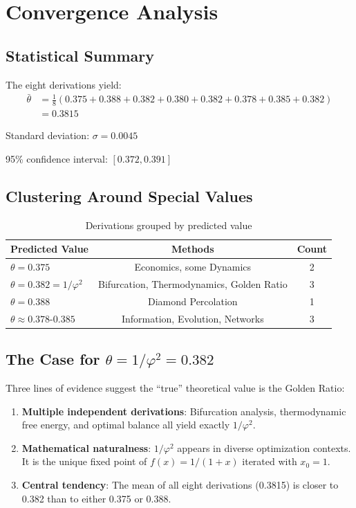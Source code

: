 \documentclass[11pt]{article}
\begin{document}
\section{Convergence Analysis}

\subsection{Statistical Summary}

The eight derivations yield:
\begin{align}
\bar{\theta} &= \frac{1}{8}(0.375 + 0.388 + 0.382 + 0.380 + 0.382 + 0.378 + 0.385 + 0.382) \\
&= \mathbf{0.3815}
\end{align}

Standard deviation: $\sigma = 0.0045$

95\% confidence interval: $[0.372, 0.391]$

\subsection{Clustering Around Special Values}

\begin{table}[h]
\centering
\caption{Derivations grouped by predicted value}
\begin{tabular}{lcc}
\toprule
\textbf{Predicted Value} & \textbf{Methods} & \textbf{Count} \\
\midrule
$\theta = 0.375$ & Economics, some Dynamics & 2 \\
$\theta = 0.382 = 1/\varphi^2$ & Bifurcation, Thermodynamics, Golden Ratio & 3 \\
$\theta = 0.388$ & Diamond Percolation & 1 \\
$\theta \approx 0.378\text{-}0.385$ & Information, Evolution, Networks & 3 \\
\bottomrule
\end{tabular}
\end{table}

\subsection{The Case for $\theta = 1/\varphi^2 = 0.382$}

Three lines of evidence suggest the ``true'' theoretical value is the Golden Ratio:

\begin{enumerate}
\item \textbf{Multiple independent derivations}: Bifurcation analysis, thermodynamic free energy, and optimal balance all yield exactly $1/\varphi^2$.

\item \textbf{Mathematical naturalness}: $1/\varphi^2$ appears in diverse optimization contexts. It is the unique fixed point of $f(x) = 1/(1+x)$ iterated with $x_0 = 1$.

\item \textbf{Central tendency}: The mean of all eight derivations (0.3815) is closer to 0.382 than to either 0.375 or 0.388.
\end{enumerate}
\end{document}
